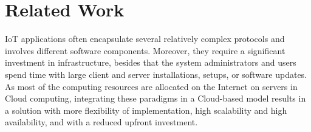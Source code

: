 \section{Related Work}
\label{sec:related_work}
IoT applications often encapsulate several relatively complex protocols and involves
different software components. Moreover, they require a significant investment in infrastructure,
besides that the system administrators and users spend time with large client and server
installations, setups, or software updates. As most of the computing resources are allocated
on the Internet on servers in Cloud computing, integrating these paradigms in a Cloud-based model
results in a solution with more flexibility of implementation, high scalability and high availability,
and with a reduced upfront investment.\\
